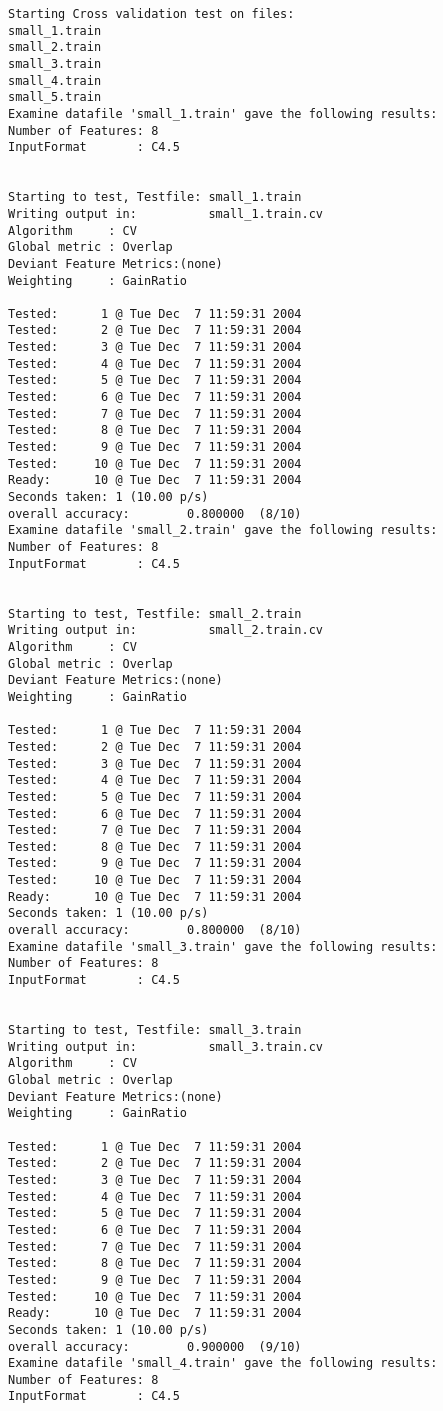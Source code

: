 \begin{footnotesize}
\begin{verbatim}
Starting Cross validation test on files:
small_1.train
small_2.train
small_3.train
small_4.train
small_5.train
Examine datafile 'small_1.train' gave the following results:
Number of Features: 8
InputFormat       : C4.5


Starting to test, Testfile: small_1.train
Writing output in:          small_1.train.cv
Algorithm     : CV
Global metric : Overlap
Deviant Feature Metrics:(none)
Weighting     : GainRatio

Tested:      1 @ Tue Dec  7 11:59:31 2004
Tested:      2 @ Tue Dec  7 11:59:31 2004
Tested:      3 @ Tue Dec  7 11:59:31 2004
Tested:      4 @ Tue Dec  7 11:59:31 2004
Tested:      5 @ Tue Dec  7 11:59:31 2004
Tested:      6 @ Tue Dec  7 11:59:31 2004
Tested:      7 @ Tue Dec  7 11:59:31 2004
Tested:      8 @ Tue Dec  7 11:59:31 2004
Tested:      9 @ Tue Dec  7 11:59:31 2004
Tested:     10 @ Tue Dec  7 11:59:31 2004
Ready:      10 @ Tue Dec  7 11:59:31 2004
Seconds taken: 1 (10.00 p/s)
overall accuracy:        0.800000  (8/10)
Examine datafile 'small_2.train' gave the following results:
Number of Features: 8
InputFormat       : C4.5


Starting to test, Testfile: small_2.train
Writing output in:          small_2.train.cv
Algorithm     : CV
Global metric : Overlap
Deviant Feature Metrics:(none)
Weighting     : GainRatio

Tested:      1 @ Tue Dec  7 11:59:31 2004
Tested:      2 @ Tue Dec  7 11:59:31 2004
Tested:      3 @ Tue Dec  7 11:59:31 2004
Tested:      4 @ Tue Dec  7 11:59:31 2004
Tested:      5 @ Tue Dec  7 11:59:31 2004
Tested:      6 @ Tue Dec  7 11:59:31 2004
Tested:      7 @ Tue Dec  7 11:59:31 2004
Tested:      8 @ Tue Dec  7 11:59:31 2004
Tested:      9 @ Tue Dec  7 11:59:31 2004
Tested:     10 @ Tue Dec  7 11:59:31 2004
Ready:      10 @ Tue Dec  7 11:59:31 2004
Seconds taken: 1 (10.00 p/s)
overall accuracy:        0.800000  (8/10)
Examine datafile 'small_3.train' gave the following results:
Number of Features: 8
InputFormat       : C4.5


Starting to test, Testfile: small_3.train
Writing output in:          small_3.train.cv
Algorithm     : CV
Global metric : Overlap
Deviant Feature Metrics:(none)
Weighting     : GainRatio

Tested:      1 @ Tue Dec  7 11:59:31 2004
Tested:      2 @ Tue Dec  7 11:59:31 2004
Tested:      3 @ Tue Dec  7 11:59:31 2004
Tested:      4 @ Tue Dec  7 11:59:31 2004
Tested:      5 @ Tue Dec  7 11:59:31 2004
Tested:      6 @ Tue Dec  7 11:59:31 2004
Tested:      7 @ Tue Dec  7 11:59:31 2004
Tested:      8 @ Tue Dec  7 11:59:31 2004
Tested:      9 @ Tue Dec  7 11:59:31 2004
Tested:     10 @ Tue Dec  7 11:59:31 2004
Ready:      10 @ Tue Dec  7 11:59:31 2004
Seconds taken: 1 (10.00 p/s)
overall accuracy:        0.900000  (9/10)
Examine datafile 'small_4.train' gave the following results:
Number of Features: 8
InputFormat       : C4.5



\end{verbatim}
\end{footnotesize}
